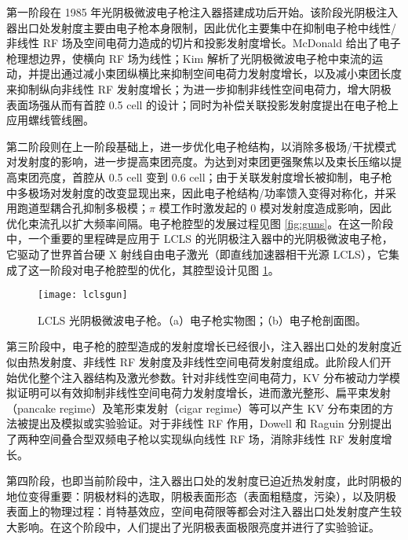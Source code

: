 第一阶段在 1985 年光阴极微波电子枪注入器搭建成功\cite{Fraser:1986aa,Fraser:1987aa}后开始。该阶段光阴极注入器出口处发射度主要由电子枪本身限制，因此优化主要集中在抑制电子枪中线性/非线性 RF 场及空间电荷力造成的切片和投影发射度增长。McDonald 给出了电子枪理想边界，使横向 RF 场为线性\cite{McDonald:1988aa}；Kim 解析了光阴极微波电子枪中束流的运动，并提出通过减小束团纵横比来抑制空间电荷力发射度增长，以及减小束团长度来抑制纵向非线性 RF 发射度增长\cite{Kim:1989ab}；为进一步抑制非线性空间电荷力，增大阴极表面场强从而有首腔 0.5 cell 的设计\cite{McDonald:1988aa}；同时为补偿关联投影发射度提出在电子枪上应用螺线管线圈\cite{Carlsten:1989aa}。

第二阶段则在上一阶段基础上，进一步优化电子枪结构，以消除多极场/干扰模式对发射度的影响，进一步提高束团亮度。为达到对束团更强聚焦以及束长压缩以提高束团亮度，首腔从 0.5 cell 变到 0.6 cell\cite{Lehrman:1992aa}；由于关联发射度增长被抑制，电子枪中多极场对发射度的改变显现出来，因此电子枪结构/功率馈入变得对称化\cite{Palmer:1998aa,guan2007study}，并采用跑道型耦合孔抑制多极模\cite{Limborg:2005vn, Akre:2008aa}；$\pi$ 模工作时激发起的 0 模对发射度造成影响，因此优化束流孔以扩大频率间隔\cite{Palmer:1998aa}。电子枪腔型的发展过程见图 \ref{fig:guns}。在这一阶段中，一个重要的里程碑是应用于 LCLS 的光阴极注入器中的光阴极微波电子枪，它驱动了世界首台硬 X 射线自由电子激光（即直线加速器相干光源 LCLS），它集成了这一阶段对电子枪腔型的优化，其腔型设计见图 \ref{fig:lcls-gun}。

\begin{figure}[htbp]
\centering
\texttt{[image: lclsgun]}
\caption{\label{fig:lcls-gun} LCLS 光阴极微波电子枪\cite{Qian:2012aa}。（a）电子枪实物图；（b）电子枪剖面图。}
\end{figure}

第三阶段中，电子枪的腔型造成的发射度增长已经很小，注入器出口处的发射度近似由热发射度、非线性 RF 发射度及非线性空间电荷发射度组成\cite{Qiu:1996aa}。此阶段人们开始优化整个注入器结构及激光参数。针对非线性空间电荷力，KV 分布\cite{Kapchinskij:1959aa}被动力学模拟证明可以有效抑制非线性空间电荷力发射度增长\cite{Limborg-Deprey:2006aa,Khojoyan:2013aa}，进而激光整形、扁平束发射（pancake regime）\cite{bazarov2009maximum}及笔形束发射（cigar regime）\cite{filippetto2014maximum}等可以产生 KV 分布束团的方法被提出及模拟或实验验证\cite{Khojoyan:2013aa,Khojoyan:2014aa,Musumeci:2008ab,Li:2012aa}。对于非线性 RF 作用，Dowell 和 Raguin 分别提出了两种空间叠合型双频电子枪\cite{Dowell:2004aa,Raguin:2005aa}以实现纵向线性 RF 场，消除非线性 RF 发射度增长。

第四阶段，也即当前阶段中，注入器出口处的发射度已迫近热发射度\cite{li2012multi,gulliford2013demonstration,karkare2011effect,karkare2015effects}，此时阴极的地位变得重要：阴极材料的选取\cite{Cultrera:2014ab}，阴极表面形态（表面粗糙度，污染）\cite{Vecchione:2012aa,Vecchione:2013aa,Ling:2013aa}，以及阴极表面上的物理过程：肖特基效应，空间电荷限等都会对注入器出口处发射度产生较大影响\cite{qian2012experimental}。在这个阶段中，人们提出了光阴极表面极限亮度并进行了实验验证\cite{bazarov2009maximum,filippetto2014maximum}。

